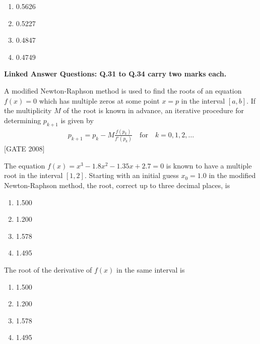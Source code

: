 \begin{multicols}{4}
\begin{enumerate}
    \item 0.5626
    \item 0.5227
    \item 0.4847
    \item 0.4749
\end{enumerate}
\end{multicols}

\textbf{Linked Answer Questions: Q.31 to Q.34 carry two marks each.}

A modified Newton-Raphson method is used to find the roots of an equation $f(x) = 0$ which has multiple zeros at some point $x = p$ in the interval $[a, b]$. If the multiplicity $M$ of the root is known in advance, an iterative procedure for determining $p_{k+1}$ is given by
\begin{align*}
  p_{k+1} = p_k - M \frac{f(p_k)}{f'(p_k)} \quad \text{for} \quad k = 0, 1, 2, \dots  
\end{align*}\hfill{[GATE 2008]}

\item The equation $f(x) = x^3 - 1.8x^2 - 1.35x + 2.7 = 0$ is known to have a multiple root in the interval $[1, 2]$. Starting with an initial guess $x_0 = 1.0$ in the modified Newton-Raphson method, the root, correct up to three decimal places, is

\begin{multicols}{4}
\begin{enumerate}
    \item 1.500
    \item 1.200
    \item 1.578
    \item 1.495
\end{enumerate}
\end{multicols}

\item The root of the derivative of $f(x)$ in the same interval is

\begin{multicols}{4}
\begin{enumerate}
    \item 1.500
    \item 1.200
    \item 1.578
    \item 1.495
\end{enumerate}
\end{multicols}

